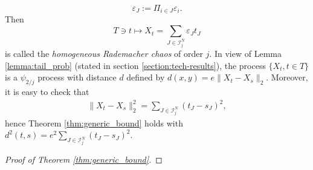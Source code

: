 \documentclass[12pt]{article}
\theoremstyle{thmstyletwo}%
\theoremstyle{thmstylethree}%
\begin{document}
\[
\varepsilon_J := \Pi_{i \in J}\varepsilon_i.
\]
Then 
\[
T\ni t\mapsto X_t = \sum_{J \in \mathcal{I}^N_j}\varepsilon_J t_J
\]
is called the \emph{homogeneous Rademacher chaos} of order $j$. 
In view of Lemma \ref{lemma:tail_prob} (stated in section \ref{section:tech-results}), the process $\{X_t, t\in T\}$ is a $\psi_{2/j}$ process with distance $d$ defined by $d(x, y) = e\|X_t - X_s\|_2$. Moreover, it is easy to check that
\begin{align*}
    \|X_t - X_s\|_2^2 = \sum_{J \in \mathcal{I}^N_j}(t_J - s_J)^2,
\end{align*}
hence Theorem \ref{thm:generic_bound} holds with $d^2(t, s) = e^2\sum_{J \in \mathcal{I}^N_j}(t_J - s_J)^2$.


\begin{proof}[Proof of Theorem \ref{thm:generic_bound}]



\end{proof}
\end{document}
